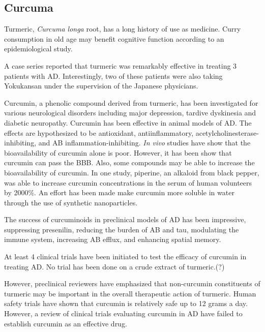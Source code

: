 \documentclass[twocolumn]{article}
\begin{document}
\subsection{Curcuma}

Turmeric, \textit{Curcuma longa} root, has a long history of use as medicine.
\cite{?}
Curry consumption in old age may benefit cognitive function
according to an epidemiological study.
\cite{ng2006curry}

A case series reported that turmeric was remarkably effective
in treating 3 patients with AD.
Interestingly, two of these patients were also taking
Yokukansan under the supervision of the Japanese physicians.
\cite{hishikawa2012effects}





Curcumin, a phenolic compound derived from turmeric,
has been investigated for various neurological disorders including
major depression, tardive dyskinesia and diabetic neuropathy.
\cite{kulkarni2010overview}
Curcumin has been effective in animal models of AD.
\cite{?}
The effects are hypothesized to be antioxidant, antiinflammatory,
acetylcholinesterase-inhibiting,
and AB inflammation-inhibiting.
\cite{?}
\textit{In vivo} studies have show that
the bioavailability of curcumin alone is poor.
\cite{?}
However, it has been show that curcumin can pass the BBB.
Also, some compounds may be able to increase the bioavailability
of curcumin. In one study, piperine, an alkaloid from black pepper,
was able to increase curcumin concentrations in the
serum of human volunteers by 2000\%.
\cite{shoba1998log}
An effort has been made make curcumin more soluble in water
through the use of synthetic nanoparticles.
\cite{mathew2012curcumin}

The success of curcuminoids in preclinical models of AD has been impressive,
suppressing presenilin,
reducing the burden of AB and tau,
modulating the immune system,
increasing AB efflux,
and enhancing spatial memory.
\cite{
yoshida2011turmeric,
shytle2012optimized,
ahmed2010curcuminoids,
ahmed2011comparative,
zhang2006curcuminoids,
villaflores2012effects
}

At least 4 clinical trials have been initiated
to test the efficacy of curcumin in treating AD.
No trial has been done on a crude extract of turmeric.(?)


However, preclinical reviewers have emphasized that non-curcumin
constituents of turmeric may be important in the overall therapeutic
action of turmeric.
\cite{ahmed2014therapeutic}
Human safety trials have shown that curcumin is relatively safe
up to 12 grams a day.
However, a review of clinical trials evaluating curcumin
in AD have failed to establish curcumin as an effective drug.
\cite{hamaguchi2010review}
\end{document}
